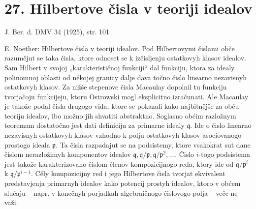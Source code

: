 \documentclass[11pt]{article}
\begin{document}
\section*{27. Hilbertove čisla v teoriji idealov}

\begin{center}
J. Ber. d. DMV 34 (1925), str. 101
\end{center}

E. Noether: Hilbertove čisla v teoriji idealov. Pod Hilbertovymi čislami obče razumějut se taka čisla, ktore odnoset se k izčisljenju ostatkovyh klasov idealov. Sam Hilbert v svojoj „karakterističnoj funkciji“ dal funkciju, ktora za idealy polinomnoj oblasti od někojej granicy dalje dava točno čislo linearno nezavisnyh ostatkovyh klasov. Za nižše stepenove čisla Macaulay dopolnil tu funkciju tvorjačoju funkcijeju, ktoru Ostrowski mogl eksplicitno izračunati. Ale Macaulay je takože podal čisla drugogo vida, ktore se pokazali kako najbitnějše za obču teoriju idealov, ibo možno jih shvatiti abstraktno. Soglasno obćim razložnym teoremam dostatočno jest dati definiciju za primarne idealy $\mathfrak q$. Ide o čislo linearno nezavisnyh ostatkovyh klasov vzhodno k polju ostatkovyh klasov asociovanogo prostogo ideala $\mathfrak p$. Ta čisla razpadajut se na podsistemy, ktore vsakokrat sut dane čislom nerazložimyh komponentov idealov $\mathfrak q,\mathfrak q/\mathfrak p,\mathfrak q/\mathfrak p^2,\ldots$. Čislo $i$-togo podsistema jest takože karakterizovano čislom členov kompozicijnogo reda, ktory ide od $\mathfrak q/\mathfrak p^i$ k $\mathfrak q/\mathfrak p^{i-1}$. Cěly kompozicijny red i jego Hilbertove čisla tvorjat ekvivalent predstavjenja primarnyh idealov kako potencij prostyh idealov, ktoro v obćem slučaju -- napr. v konečnyh porjadkah algebraičnogo čislovogo polja -- veče ne važi.
\end{document}
